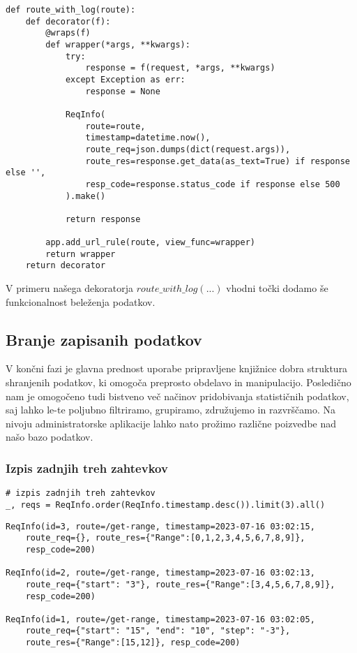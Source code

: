 \documentclass[a4paper,12pt,openright]{book}
\begin{document}
\begin{verbatim}
def route_with_log(route):
    def decorator(f):
        @wraps(f)
        def wrapper(*args, **kwargs):
            try:
                response = f(request, *args, **kwargs)
            except Exception as err:
                response = None

            ReqInfo(
                route=route,
                timestamp=datetime.now(),
                route_req=json.dumps(dict(request.args)),
                route_res=response.get_data(as_text=True) if response else '',
                resp_code=response.status_code if response else 500
            ).make()

            return response
        
        app.add_url_rule(route, view_func=wrapper)
        return wrapper
    return decorator
\end{verbatim}

    \noindent
    V primeru našega dekoratorja $route\_with\_log(...)$ vhodni točki dodamo še funkcionalnost beleženja podatkov.

    \subsection{Branje zapisanih podatkov}

    V končni fazi je glavna prednost uporabe pripravljene knjižnice dobra struktura shranjenih podatkov, ki omogoča preprosto obdelavo in manipulacijo. Posledično nam je omogočeno tudi bistveno več načinov pridobivanja statističnih podatkov, saj lahko le-te poljubno filtriramo, grupiramo, združujemo in razvrščamo. Na nivoju administratorske aplikacije lahko nato prožimo različne poizvedbe nad našo bazo podatkov.

    \subsubsection{Izpis zadnjih treh zahtevkov}

\begin{verbatim}
# izpis zadnjih treh zahtevkov
_, reqs = ReqInfo.order(ReqInfo.timestamp.desc()).limit(3).all()
\end{verbatim}

\begin{verbatim}
ReqInfo(id=3, route=/get-range, timestamp=2023-07-16 03:02:15, 
    route_req={}, route_res={"Range":[0,1,2,3,4,5,6,7,8,9]},
    resp_code=200)
    
ReqInfo(id=2, route=/get-range, timestamp=2023-07-16 03:02:13, 
    route_req={"start": "3"}, route_res={"Range":[3,4,5,6,7,8,9]},
    resp_code=200)
    
ReqInfo(id=1, route=/get-range, timestamp=2023-07-16 03:02:05,
    route_req={"start": "15", "end": "10", "step": "-3"},
    route_res={"Range":[15,12]}, resp_code=200)
\end{verbatim}
\end{document}
